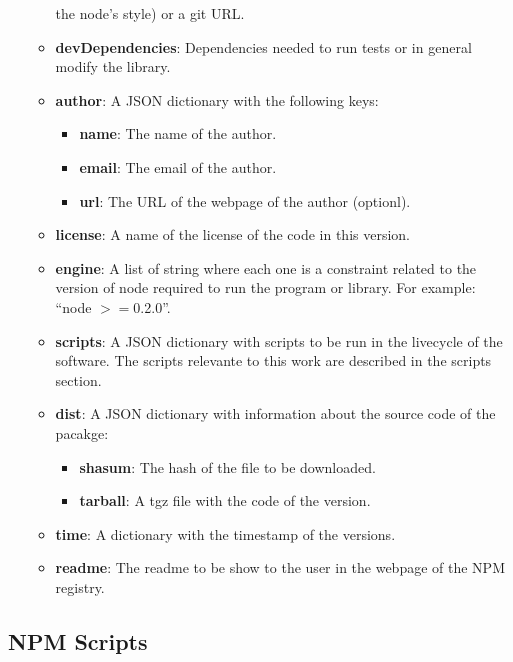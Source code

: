 \documentclass[letterpaper,12pt]{report}
\begin{document}
\begin{itemize}
\begin{itemize}
                the node's style) or a git URL.
            \item \textbf{devDependencies}: Dependencies needed to run tests or
                in general modify the library.
            \item \textbf{author}: A JSON dictionary with the following keys:
                \begin{itemize}
                    \item \textbf{name}: The name of the author.
                    \item \textbf{email}: The email of the author.
                    \item \textbf{url}: The URL of the webpage of the author
                        (optionl).
                \end{itemize}
            \item \textbf{license}: A name of the license of the code in this
                version.
            \item \textbf{engine}: A list of string where each one is a
                constraint related to the version of node required to run the
                program or library. For example: ``node $>=$0.2.0''.
            \item \textbf{scripts}: A JSON dictionary with scripts to be run in
                the livecycle of the software. The scripts relevante to this
                work are described in the scripts section.
            \item \textbf{dist}: A JSON dictionary with information about the
                source code of the pacakge:
                \begin{itemize}
                    \item \textbf{shasum}: The hash of the file to be
                        downloaded.
                    \item \textbf{tarball}: A tgz file with the code of the
                        version.
                \end{itemize}
            \item \textbf{time}: A dictionary with the timestamp of the
                versions.
            \item \textbf{readme}: The readme to be show to the user in the
                webpage of the NPM registry.
        \end{itemize}
\end{itemize}



\subsection{NPM Scripts}
\end{document}
